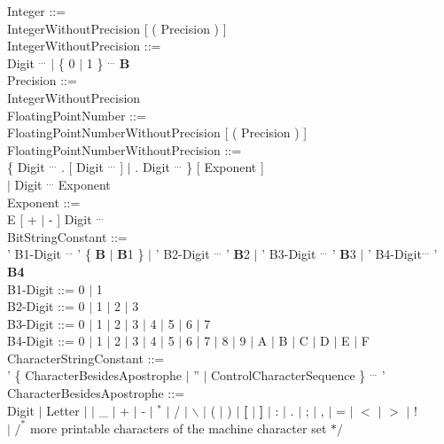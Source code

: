 Integer ::=\\
\x IntegerWithoutPrecision [ ( Precision ) ]\\

IntegerWithoutPrecision ::=\\
\x Digit $^{...}$ $\mid$ \{ 0 $\mid$ 1 \} $^{...}$ {\bf B}\\

Precision ::=\\
\x IntegerWithoutPrecision\\

FloatingPointNumber ::=\\
\x FloatingPointNumberWithoutPrecision [ ( Precision ) ]\\

FloatingPointNumberWithoutPrecision ::=\\
\x \{ Digit $^{...}$ . [ Digit $^{...}$ ] $\mid$ . Digit $^{...}$ \} [ Exponent ]\\
\x $\mid$ Digit $^{...}$ Exponent\\

Exponent ::=\\
E [ + $\mid$ - ] Digit $^{...}$\\

BitStringConstant ::=\\
\x ' B1-Digit $^{...}$ ' \{ {\bf B} $\mid$ {\bf B}1 \} $\mid$ ' B2-Digit $^{...}$ ' {\bf B}2 $\mid$ ' B3-Digit $^{...}$ ' {\bf B}3 $\mid$ ' B4-Digit$^{...}$ ' {\bf B4}\\

B1-Digit ::= 0 $\mid$ 1\\

B2-Digit ::= 0 $\mid$ 1 $\mid$ 2 $\mid$ 3\\

B3-Digit ::= 0 $\mid$ 1 $\mid$ 2 $\mid$ 3 $\mid$ 4 $\mid$ 5 $\mid$ 6 $\mid$ 7\\

B4-Digit ::= 0 $\mid$ 1 $\mid$ 2 $\mid$ 3 $\mid$ 4 $\mid$ 5 $\mid$ 6 $\mid$ 7 $\mid$ 8 $\mid$ 9 $\mid$ A $\mid$ B $\mid$ C $\mid$ D $\mid$ E $\mid$ F\\

CharacterStringConstant ::=\\
\x ' \{ CharacterBesidesApostrophe $\mid$ '' $\mid$ ControlCharacterSequence \} $^{...}$ '\\

CharacterBesidesApostrophe ::=\\
\x Digit $\mid$ Letter $\mid$ \x $\mid$ \_ $\mid$ + $\mid$ - $\mid$ $^*$ $\mid$ / $\mid$ $\backslash$ $\mid$ ( $\mid$ ) $\mid$ {\bf [} $\mid$ {\bf ]} $\mid$ : $\mid$ . $\mid$ ; $\mid$ , $\mid$ = $\mid$ $<$ $\mid$ $>$ $\mid$ !\\
\x $\mid$ $/^*$ more printable characters of the machine character set $*/$ \\

